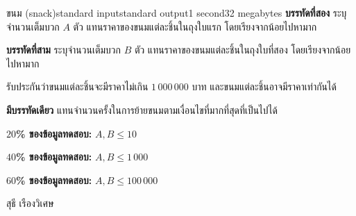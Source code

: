 \documentclass[11pt,a4paper]{article}
\begin{document}
\begin{problem}{ขนม (snack)}{standard input}{standard output}{1 second}{32 megabytes}
\textbf{บรรทัดที่สอง} ระบุจำนวนเต็มบวก $A$ ตัว แทนราคาของขนมแต่ละชิ้นในถุงใบแรก โดยเรียงจากน้อยไปหามาก

\textbf{บรรทัดที่สาม} ระบุจำนวนเต็มบวก $B$ ตัว แทนราคาของขนมแต่ละชิ้นในถุงใบที่สอง โดยเรียงจากน้อยไปหามาก

รับประกันว่าขนมแต่ละชิ้นจะมีราคาไม่เกิน $1\,000\,000$ บาท และขนมแต่ละชิ้นอาจมีราคาเท่ากันได้



\OutputFile

\textbf{มีบรรทัดเดียว} แทนจำนวนครั้งในการย้ายขนมตามเงื่อนไขที่มากที่สุดที่เป็นไปได้

\Examples

\begin{example}
%
%
\end{example}

\Scoring 

\textbf{$20$\% ของข้อมูลทดสอบ:} $A,B \leq 10$

\textbf{$40$\% ของข้อมูลทดสอบ:} $A,B \leq 1\,000$

\textbf{$60$\% ของข้อมูลทดสอบ:} $A,B \leq 100\,000$


\Source

สุธี เรืองวิเศษ

\end{problem}
\end{document}
